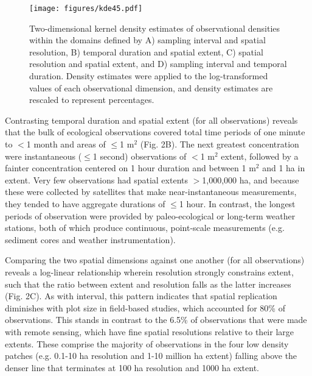 \documentclass[12pt]{article}
\begin{document}

\begin{figure}[!ht]
\texttt{[image: figures/kde45.pdf]}
\vspace{-0.15 cm}
\caption{Two-dimensional kernel density estimates of observational densities within the domains defined by A) sampling interval and spatial resolution, B) temporal duration and spatial extent, C) spatial resolution and spatial extent, and D) sampling interval and temporal duration. Density estimates were applied to the log-transformed values of each observational dimension, and density estimates are rescaled to represent percentages. }
\label{afoto1}
\end{figure}

Contrasting temporal duration and spatial extent (for all observations) reveals that the bulk of ecological observations covered total time periods of one minute to $<$1 month and areas of $\leq$1 m$^2$ (Fig. 2B). The next greatest concentration were instantaneous ($\leq$1 second) observations of $<$1 m$^2$ extent, followed by a fainter concentration centered on 1 hour duration and between 1 m$^2$ and 1 ha in extent. Very few observations had spatial extents $>$1,000,000 ha, and because these were collected by satellites that make near-instantaneous measurements, they tended to have aggregate durations of $\leq$1 hour. In contrast, the longest periods of observation were provided by paleo-ecological or long-term weather stations, both of which produce continuous, point-scale measurements (e.g. sediment cores and weather instrumentation). 

Comparing the two spatial dimensions against one another (for all observations) reveals a log-linear relationship wherein resolution strongly constrains extent, such that the ratio between extent and resolution falls as the latter increases (Fig. 2C). As with interval, this pattern indicates that spatial replication diminishes with plot size \cite{kareiva_spatial_1988} in field-based studies, which accounted for 80\% of observations. This stands in contrast to the 6.5\% of observations that were made with remote sensing, which have fine spatial resolutions relative to their large extents. These comprise the majority of observations in the four low density patches (e.g. 0.1-10 ha resolution and 1-10 million ha extent) falling above the denser line that terminates at 100 ha resolution and 1000 ha extent.  
\end{document}
